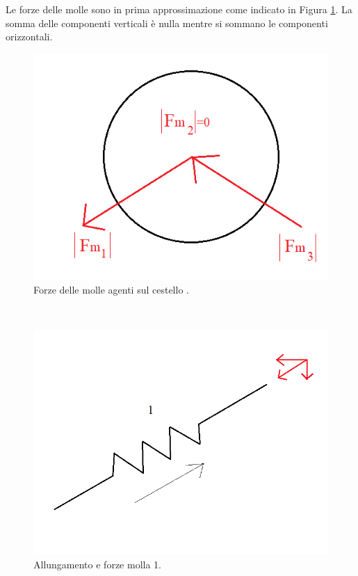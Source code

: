 Le forze delle molle sono in prima approssimazione come indicato in Figura \ref{ForzeMolle}. La somma delle componenti verticali è nulla mentre si sommano le componenti orizzontali. 
\begin{figure}[h]
    \centering
    \includegraphics[scale=0.5]{LavatriceForze3Molle.png}
    \caption{Forze delle molle agenti sul cestello .}
    \label{ForzeMolle}
\end{figure}
\\
\begin{figure}[h]
    \centering
    \includegraphics[scale=0.4]{Molla 1.png}
    \caption{Allungamento e forze molla 1.}
    \label{Molla1}
\end{figure}
